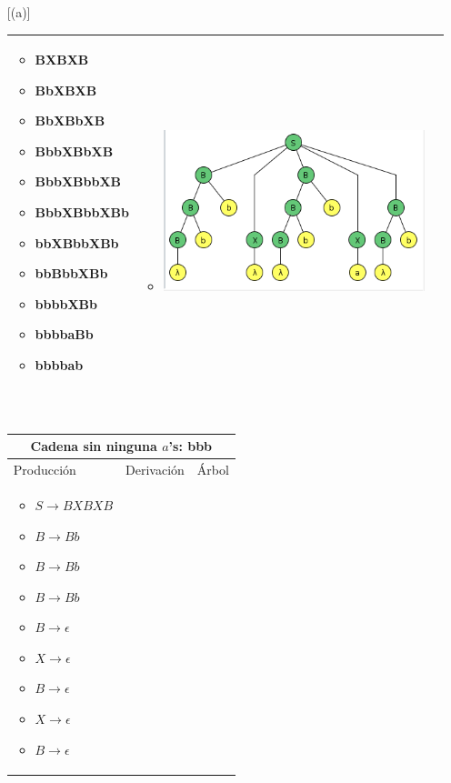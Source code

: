 \documentclass{article}
\begin{document}
\begin{enumerate} [(a)]
\begin{tabular}{|p{3.5cm}|p{3.5cm}|p{8cm}|  }
\begin{itemize}[label={}]
             \item	BXBXB 
             \item BbXBXB 
             \item BbXBbXB 
             \item BbbXBbXB 
             \item BbbXBbbXB 
             \item BbbXBbbXBb 
             \item bbXBbbXBb 
             \item bbBbbXBb 
             \item bbbbXBb 
             \item bbbbaBb 
             \item bbbbab 
        \end{itemize}
        &
         \begin{itemize}[label={}]
             \item \includegraphics[scale=0.40]{img/2c-bbbbab.png}
        \end{itemize}
        \\ \hline
        \end{tabular}
        \\
        \begin{tabular}{|p{3.5cm}|p{3.5cm}|p{8cm}|  }
         \hline
         \multicolumn{3}{|c|}{Cadena sin ninguna  $a$'s: bbb} \\
         \hline
         Producción & Derivación & Árbol\\
         \hline
          \begin{itemize}[label={}]
             
              \item $ S \to BXBXB$ 
         \item $ B \to Bb$ 
         \item $ B \to Bb$ 
         \item $ B \to Bb$ 
         \item $ B \to \epsilon $ 
         \item $ X \to \epsilon$	
         \item $ B \to \epsilon$ 
         \item $ X \to \epsilon$
         \item $ B \to \epsilon$
         

\end{itemize}
\end{tabular}
\end{enumerate}
\end{document}

